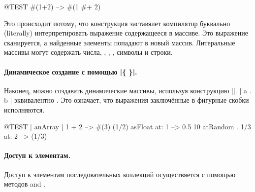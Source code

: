 \documentclass[a4paper,10pt,twoside]{book}
\begin{document}
\begin{code}{@TEST}
#(1+2) -->  #(1 #+ 2)
\end{code}

\noindent
Это происходит потому, что конструкция \ct{#()} заставялет компилятор буквально (literally) интерпретировать выражение содержащееся в массиве. Это выражение сканируется, а найденные элементы попадают в новый массив. Литеральные массивы могут содержать числа, , , , символы и строки.

\paragraph{Динамическое создание с помощью \ct|\{ \}|.}
Наконец, можно создавать динамические массивы, используя конструкцию \ct|{}|. \ct|{ a . b }| эквивалентно . Это означает, что выражения заключённые в фигурные скобки исполняются.

\begin{code}{@TEST | anArray |}
{ 1 + 2 } --> #(3)
{(1/2) asFloat} at: 1 --> 0.5
{10 atRandom . 1/3} at: 2 --> (1/3)
\end{code}

\paragraph{Доступ к элементам.}
Доступ к элементам последовательных коллекций осуществяется с помощью методов  and .
\end{document}

